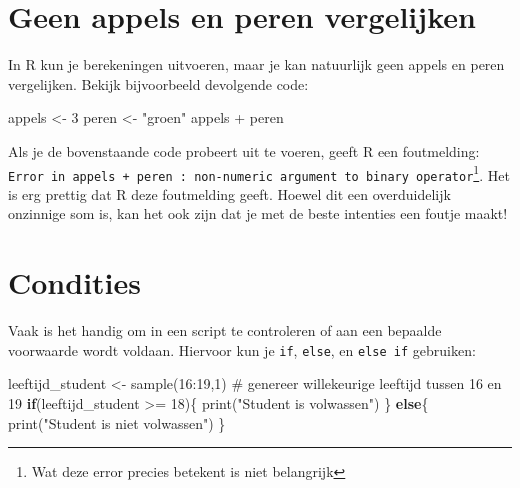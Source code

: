 \documentclass[
  a4paper,
]{scrbook}
\newenvironment{Shaded}{\begin{snugshade}}{\end{snugshade}}
\newcommand{\CommentTok}[1]{\textcolor[rgb]{0.37,0.37,0.37}{#1}}
\newcommand{\ControlFlowTok}[1]{\textcolor[rgb]{0.00,0.23,0.31}{\textbf{#1}}}
\newcommand{\DecValTok}[1]{\textcolor[rgb]{0.68,0.00,0.00}{#1}}
\newcommand{\FunctionTok}[1]{\textcolor[rgb]{0.28,0.35,0.67}{#1}}
\newcommand{\NormalTok}[1]{\textcolor[rgb]{0.00,0.23,0.31}{#1}}
\newcommand{\OtherTok}[1]{\textcolor[rgb]{0.00,0.23,0.31}{#1}}
\newcommand{\SpecialCharTok}[1]{\textcolor[rgb]{0.37,0.37,0.37}{#1}}
\newcommand{\StringTok}[1]{\textcolor[rgb]{0.13,0.47,0.30}{#1}}
\theoremstyle{definition}
\theoremstyle{remark}
\begin{document}
\section{Geen appels en peren
vergelijken}\label{geen-appels-en-peren-vergelijken}

In R kun je berekeningen uitvoeren, maar je kan natuurlijk geen appels
en peren vergelijken. Bekijk bijvoorbeeld devolgende code:

\begin{Shaded}
\begin{Highlighting}[]
\NormalTok{appels }\OtherTok{\textless{}{-}} \DecValTok{3}
\NormalTok{peren }\OtherTok{\textless{}{-}} \StringTok{"groen"}
\NormalTok{appels }\SpecialCharTok{+}\NormalTok{ peren}
\end{Highlighting}
\end{Shaded}

Als je de bovenstaande code probeert uit te voeren, geeft R een
foutmelding:
\texttt{Error\ in\ appels\ +\ peren\ :\ non-numeric\ argument\ to\ binary\ operator}\footnote{Wat
  deze error precies betekent is niet belangrijk}. Het is erg prettig
dat R deze foutmelding geeft. Hoewel dit een overduidelijk onzinnige som
is, kan het ook zijn dat je met de beste intenties een foutje maakt!

\section{Condities}\label{condities}

Vaak is het handig om in een script te controleren of aan een bepaalde
voorwaarde wordt voldaan. Hiervoor kun je \texttt{if}, \texttt{else}, en
\texttt{else\ if} gebruiken:

\begin{Shaded}
\begin{Highlighting}[]
\NormalTok{leeftijd\_student }\OtherTok{\textless{}{-}} \FunctionTok{sample}\NormalTok{(}\DecValTok{16}\SpecialCharTok{:}\DecValTok{19}\NormalTok{,}\DecValTok{1}\NormalTok{) }\CommentTok{\# genereer willekeurige leeftijd tussen 16 en 19}
\ControlFlowTok{if}\NormalTok{(leeftijd\_student }\SpecialCharTok{\textgreater{}=} \DecValTok{18}\NormalTok{)\{}
  \FunctionTok{print}\NormalTok{(}\StringTok{"Student is volwassen"}\NormalTok{)}
\NormalTok{\} }\ControlFlowTok{else}\NormalTok{\{}
  \FunctionTok{print}\NormalTok{(}\StringTok{"Student is niet volwassen"}\NormalTok{)}
\NormalTok{\}}
\end{Highlighting}
\end{Shaded}
\end{document}
